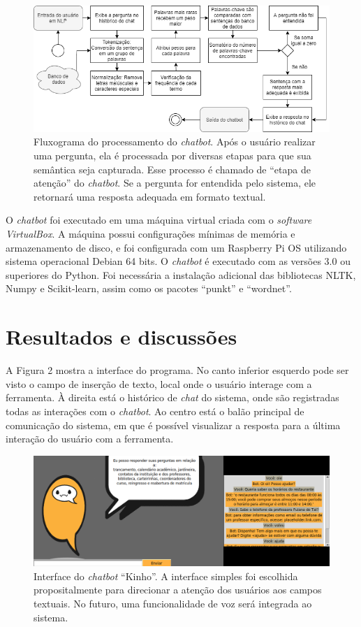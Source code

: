 \documentclass[12pt]{article}
\begin{document}
\begin{figure}[ht]
\centering
\includegraphics[width=1\textwidth]{fig1.png}
\caption{Fluxograma do processamento do {\itshape chatbot}. Após o usuário realizar uma pergunta, ela é processada por diversas etapas para que sua semântica seja capturada. Esse processo é chamado de “etapa de atenção” do {\itshape chatbot}. Se a pergunta for entendida pelo sistema, ele retornará uma resposta adequada em formato textual. }
\label{fig:exampleFig1}
\end{figure}

O {\itshape chatbot} foi executado em uma máquina virtual criada com o {\itshape software VirtualBox}. A máquina possui configurações mínimas de memória e armazenamento de disco, e foi configurada com um Raspberry Pi OS utilizando sistema operacional Debian 64 bits. O {\itshape chatbot} é executado com as versões 3.0 ou superiores do Python. Foi necessária a instalação adicional das bibliotecas NLTK, Numpy e Scikit-learn, assim como os pacotes “punkt” e “wordnet”.


\section{Resultados e discussões}

A Figura 2 mostra a interface do programa. No canto inferior esquerdo pode ser visto o campo de inserção de texto, local onde o usuário interage com a ferramenta. À direita está o histórico de {\itshape chat} do sistema, onde são registradas todas as interações com o {\itshape chatbot}. Ao centro está o balão principal de comunicação do sistema, em que é possível visualizar a resposta para a última interação do usuário com a ferramenta.

\begin{figure}[ht]
\centering
\includegraphics[width=1\textwidth]{fig2.png}
\caption{Interface do {\itshape chatbot} “Kinho”. A interface simples foi escolhida propositalmente para direcionar a atenção dos usuários aos campos textuais. No futuro, uma funcionalidade de voz será integrada ao sistema.}
\label{fig:exampleFig2}
\end{figure}
\end{document}
